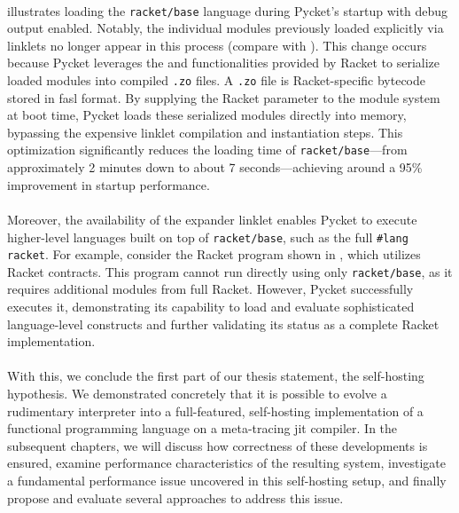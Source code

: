 
		\paragraph{}%
			 illustrates loading the \texttt{racket/base} language during Pycket's startup with debug output enabled. Notably, the individual modules previously loaded explicitly via linklets no longer appear in this process (compare with ). This change occurs because Pycket leverages the  and  functionalities provided by Racket to serialize loaded modules into compiled \texttt{.zo} files. A \texttt{.zo} file is Racket-specific bytecode stored in fasl format. By supplying the Racket parameter  to the module system at boot time, Pycket loads these serialized modules directly into memory, bypassing the expensive linklet compilation and instantiation steps. This optimization significantly reduces the loading time of \texttt{racket/base}—from approximately 2 minutes down to about 7 seconds—achieving around a 95\% improvement in startup performance.

		\paragraph{}%
			Moreover, the availability of the expander linklet enables Pycket to execute higher-level languages built on top of \texttt{racket/base}, such as the full \texttt{\#lang racket}. For example, consider the Racket program shown in , which utilizes Racket contracts. This program cannot run directly using only \texttt{racket/base}, as it requires additional modules from full Racket. However, Pycket successfully executes it, demonstrating its capability to load and evaluate sophisticated language-level constructs and further validating its status as a complete Racket implementation.


		\paragraph{}%
			With this, we conclude the first part of our thesis statement, the self-hosting hypothesis. We demonstrated concretely that it is possible to evolve a rudimentary interpreter into a full-featured, self-hosting implementation of a functional programming language on a meta-tracing \gls{jit} compiler. In the subsequent chapters, we will discuss how correctness of these developments is ensured, examine performance characteristics of the resulting system, investigate a fundamental performance issue uncovered in this self-hosting setup, and finally propose and evaluate several approaches to address this issue.




